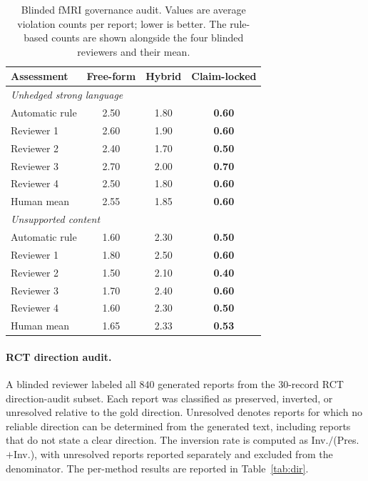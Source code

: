 \documentclass[10pt,twocolumn]{article}
\begin{document}
\begin{table}[h]
	\caption{Blinded fMRI governance audit. Values are average violation counts per report; lower is better. The rule-based counts are shown alongside the four blinded reviewers and their mean.}
	\label{tab:human-governance}
	\centering
	\footnotesize
	\setlength{\tabcolsep}{5pt}
	\begin{tabular}{lccc}
		\toprule
		Assessment & Free-form & Hybrid & Claim-locked \\
		\midrule
		\multicolumn{4}{l}{\textit{Unhedged strong language}} \\
		Automatic rule & 2.50 & 1.80 & \textbf{0.60} \\
		Reviewer 1     & 2.60 & 1.90 & \textbf{0.60} \\
		Reviewer 2     & 2.40 & 1.70 & \textbf{0.50} \\
		Reviewer 3     & 2.70 & 2.00 & \textbf{0.70} \\
		Reviewer 4     & 2.50 & 1.80 & \textbf{0.60} \\
		Human mean     & 2.55 & 1.85 & \textbf{0.60} \\
		\midrule
		\multicolumn{4}{l}{\textit{Unsupported content}} \\
		Automatic rule & 1.60 & 2.30 & \textbf{0.50} \\
		Reviewer 1     & 1.80 & 2.50 & \textbf{0.60} \\
		Reviewer 2     & 1.50 & 2.10 & \textbf{0.40} \\
		Reviewer 3     & 1.70 & 2.40 & \textbf{0.60} \\
		Reviewer 4     & 1.60 & 2.30 & \textbf{0.50} \\
		Human mean     & 1.65 & 2.33 & \textbf{0.53} \\
		\bottomrule
	\end{tabular}
\end{table}

\paragraph{RCT direction audit.} A blinded reviewer labeled all $840$ generated reports from the $30$-record RCT direction-audit subset. Each report was classified as preserved, inverted, or unresolved relative to the gold direction. Unresolved denotes reports for which no reliable direction can be determined from the generated text, including reports that do not state a clear direction. The inversion rate is computed as Inv.$/$(Pres.$+$Inv.), with unresolved reports reported separately and excluded from the denominator. The per-method results are reported in Table~\ref{tab:dir}.
\end{document}
